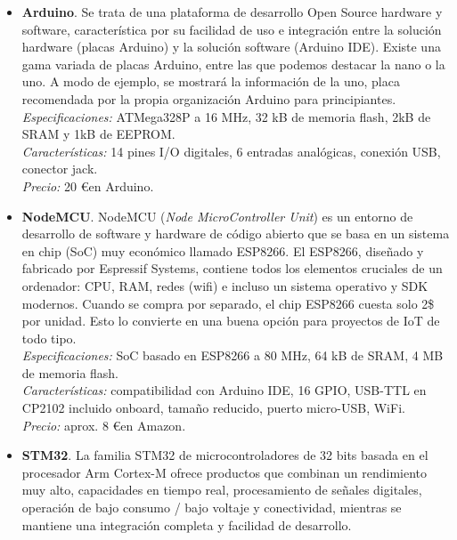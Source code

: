 \documentclass[12pt]{article}
\begin{document}
	\begin{itemize}
		\item \textbf{Arduino}. Se trata de una plataforma de desarrollo Open Source hardware y software, característica por su facilidad de uso e integración entre la solución hardware (placas Arduino) y la solución software (Arduino IDE). Existe una gama variada de placas Arduino, entre las que podemos destacar la nano o la uno. A modo de ejemplo, se mostrará la información de la uno, placa recomendada por la propia organización Arduino para principiantes.\\
		
		\textit{Especificaciones:} ATMega328P a 16 MHz, 32 kB de memoria flash, 2kB de SRAM y 1kB de EEPROM.\\
		
		\textit{Características:} 14 pines I/O digitales, 6 entradas analógicas, conexión USB, conector jack. \\
		
		\textit{Precio:} 20 \euro \enspace en Arduino.\\
		
		\item \textbf{NodeMCU}. NodeMCU (\textit{Node MicroController Unit}) es un entorno de desarrollo de software y hardware de código abierto que se basa en un sistema en chip (SoC) muy económico llamado ESP8266. El ESP8266, diseñado y fabricado por Espressif Systems, contiene todos los elementos cruciales de un ordenador: CPU, RAM, redes (wifi) e incluso un sistema operativo y SDK modernos. Cuando se compra por separado, el chip ESP8266 cuesta solo 2\$ por unidad. Esto lo convierte en una buena opción para proyectos de IoT de todo tipo. \\
		
		\textit{Especificaciones:} SoC basado en ESP8266 a 80 MHz, 64 kB de SRAM, 4 MB de memoria flash.\\ 
		
		\textit{Características:} compatibilidad con Arduino IDE, 16 GPIO, USB-TTL en CP2102 incluido onboard, tamaño reducido, puerto micro-USB, WiFi.\\
		
		\textit{Precio:} aprox. 8 \euro \enspace en Amazon.\\
	
		\item \textbf{STM32}. La familia STM32 de microcontroladores de 32 bits basada en el procesador Arm Cortex-M ofrece productos que combinan un rendimiento muy alto, capacidades en tiempo real, procesamiento de señales digitales, operación de bajo consumo / bajo voltaje y conectividad, mientras se mantiene una integración completa y facilidad de desarrollo.
		

\end{itemize}
\end{document}
